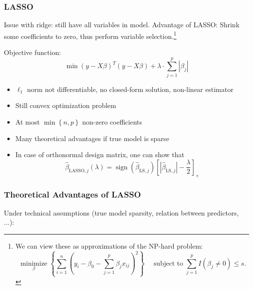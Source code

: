 \documentclass[11pt, %
	oneside, %
	english, %
	onehalfspacing, %
	]{article} %
\numberwithin{equation}{section}
\begin{document}
\subsubsection*{LASSO}

Issue with ridge: still have all variables in model. Advantage of LASSO: Shrink some coefficients to zero, thus perform variable selection.\footnote{We can view these as approximations of the NP-hard problem:
\begin{equation*}
    \underset{\beta}{\operatorname{minimize}}\left\{\sum_{i=1}^n\left(y_i-\beta_0-\sum_{j=1}^p \beta_j x_{i j}\right)^2\right\} \quad \text { subject to } \sum_{j=1}^p I\left(\beta_j \neq 0\right) \leq s .
\end{equation*} }

Objective function:
\begin{equation*}
    \min (y-X \beta)^T(y-X \beta)+\lambda \cdot \sum_{j=1}^p\left|\beta_j\right|
\end{equation*}
\begin{itemize}
    \item $\ell_1$ norm not differentiable, no closed-form solution, non-linear estimator
    \item Still convex optimization problem
    \item At most $\min \left\{n,p\right\}$ non-zero coefficients
    \item Many theoretical advantages if true model is sparse
    \item In case of orthonormal design matrix, one can show that
    \begin{equation*}
        \hat{\beta}_{\mathrm{LASSO}, j}(\lambda)=\operatorname{sign}\left(\hat{\beta}_{\mathrm{LS}, j}\right)\left[\left|\hat{\beta}_{\mathrm{LS}, j}\right|-\frac{\lambda}{2}\right]_{+}
    \end{equation*}
\end{itemize}

\subsubsection*{Theoretical Advantages of LASSO}

Under technical assumptions (true model sparsity, relation between predictors, ...):
\end{document}
